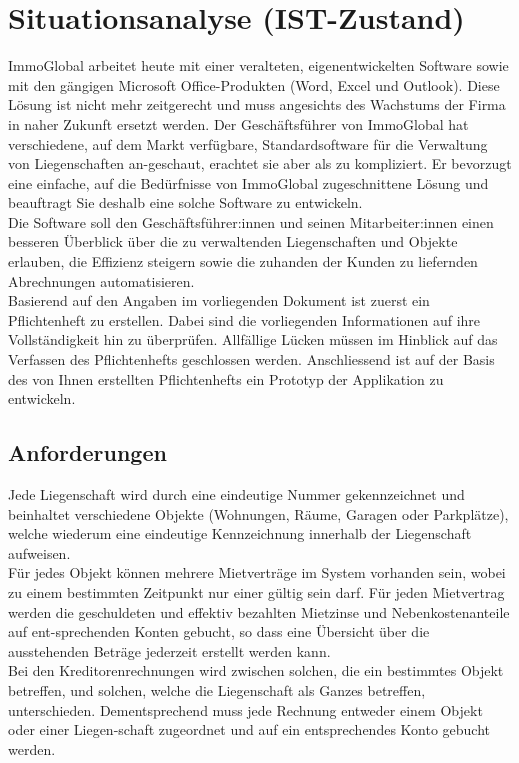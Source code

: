 \section{Situationsanalyse (IST-Zustand)}
ImmoGlobal arbeitet heute mit einer veralteten, eigenentwickelten Software sowie mit den gängigen Microsoft Office-Produkten (Word, Excel und Outlook). Diese Lösung ist nicht mehr zeitgerecht und muss angesichts des Wachstums der Firma in naher Zukunft ersetzt werden. Der Geschäftsführer von ImmoGlobal hat verschiedene, auf dem Markt verfügbare, Standardsoftware für die Verwaltung von Liegenschaften an-geschaut, erachtet sie aber als zu kompliziert. Er bevorzugt eine einfache, auf die Bedürfnisse von ImmoGlobal zugeschnittene Lösung und beauftragt Sie deshalb eine solche Software zu entwickeln.\\
Die Software soll den Geschäftsführer:innen und seinen Mitarbeiter:innen einen besseren Überblick über die zu verwaltenden Liegenschaften und Objekte erlauben, die Effizienz steigern sowie die zuhanden der Kunden zu liefernden Abrechnungen automatisieren.\\
Basierend auf den Angaben im vorliegenden Dokument ist zuerst ein Pflichtenheft zu erstellen. Dabei sind die vorliegenden Informationen auf ihre Vollständigkeit hin zu überprüfen. Allfällige Lücken müssen im Hinblick auf das Verfassen des Pflichtenhefts geschlossen werden. Anschliessend ist auf der Basis des von Ihnen erstellten Pflichtenhefts ein Prototyp der Applikation zu entwickeln.

\subsection{Anforderungen}
Jede Liegenschaft wird durch eine eindeutige Nummer gekennzeichnet und beinhaltet verschiedene Objekte (Wohnungen, Räume, Garagen oder Parkplätze), welche wiederum eine eindeutige Kennzeichnung innerhalb der Liegenschaft aufweisen.\\
Für jedes Objekt können mehrere Mietverträge im System vorhanden sein, wobei zu einem bestimmten Zeitpunkt nur einer gültig sein darf. Für jeden Mietvertrag werden die geschuldeten und effektiv bezahlten Mietzinse und Nebenkostenanteile auf ent-sprechenden Konten gebucht, so dass eine Übersicht über die ausstehenden Beträge jederzeit erstellt werden kann.\\
Bei den Kreditorenrechnungen wird zwischen solchen, die ein bestimmtes Objekt betreffen, und solchen, welche die Liegenschaft als Ganzes betreffen, unterschieden. Dementsprechend muss jede Rechnung entweder einem Objekt oder einer Liegen-schaft zugeordnet und auf ein entsprechendes Konto gebucht werden.\\

